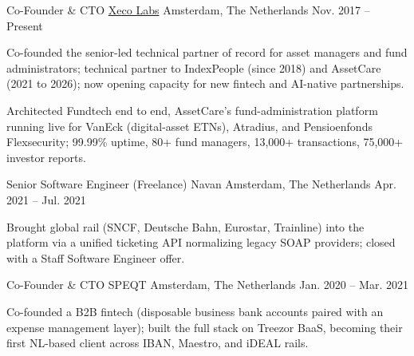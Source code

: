 \begin{cventries}

  \cventry
    {Co-Founder \& CTO} %
    {\href{https://www.xecolabs.com}{Xeco Labs}} %
    {Amsterdam, The Netherlands} %
    {Nov. 2017 -- Present} %
    {
      \begin{cvitems}
        \item {Co-founded the senior-led technical partner of record for asset managers and fund administrators; technical partner to IndexPeople (since 2018) and AssetCare (2021 to 2026); now opening capacity for new fintech and AI-native partnerships.}
        \item {Architected Fundtech end to end, AssetCare's fund-administration platform running live for VanEck (digital-asset ETNs), Atradius, and Pensioenfonds Flexsecurity; 99.99\% uptime, 80+ fund managers, 13,000+ transactions, 75,000+ investor reports.}
      \end{cvitems}
    }

  \cventry
    {Senior Software Engineer (Freelance)} %
    {Navan} %
    {Amsterdam, The Netherlands} %
    {Apr. 2021 -- Jul. 2021} %
    {
      \begin{cvitems}
        \item {Brought global rail (SNCF, Deutsche Bahn, Eurostar, Trainline) into the platform via a unified ticketing API normalizing legacy SOAP providers; closed with a Staff Software Engineer offer.}
      \end{cvitems}
    }

  \cventry
    {Co-Founder \& CTO} %
    {SPEQT} %
    {Amsterdam, The Netherlands} %
    {Jan. 2020 -- Mar. 2021} %
    {
      \begin{cvitems}
        \item {Co-founded a B2B fintech (disposable business bank accounts paired with an expense management layer); built the full stack on Treezor BaaS, becoming their first NL-based client across IBAN, Maestro, and iDEAL rails.}
      \end{cvitems}
    }


\end{cventries}

